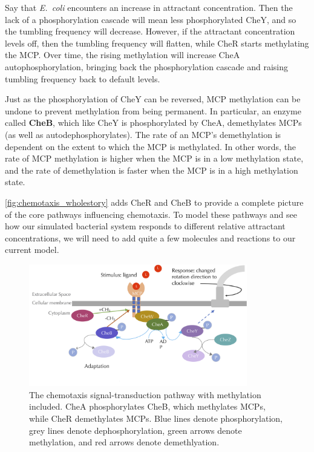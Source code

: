 Say that \textit{E.~coli} encounters an increase in attractant concentration. Then the lack of a phosphorylation cascade will mean less phosphorylated CheY, and so the tumbling frequency will decrease. However, if the attractant concentration levels off, then the tumbling frequency will flatten, while CheR starts methylating the MCP. Over time, the rising methylation will increase CheA autophosphorylation, bringing back the phosphorylation cascade and raising tumbling frequency back to default levels.

Just as the phosphorylation of CheY can be reversed, MCP methylation can be undone to prevent methylation from being permanent. In particular, an enzyme called \textbf{CheB}, which like CheY is phosphorylated by CheA, demethylates MCPs (as well as autodephosphorylates). The rate of an MCP's demethylation is dependent on the extent to which the MCP is methylated. In other words, the rate of MCP methylation is higher when the MCP is in a low methylation state, and the rate of demethylation is faster when the MCP is in a high methylation state.

\autoref{fig:chemotaxis_wholestory} adds CheR and CheB to provide a complete picture of the core pathways influencing chemotaxis. To model these pathways and see how our simulated bacterial system responds to different relative attractant concentrations, we will need to add quite a few molecules and reactions to our current model.\\

\begin{figure}[h]
\centering
\mySfFamily
\includegraphics[width = 0.85\textwidth]{../images/chemotaxis_wholestory.png}
\caption{The chemotaxis signal-transduction pathway with methylation included. CheA phosphorylates CheB, which methylates MCPs, while CheR demethylates MCPs. Blue lines denote phosphorylation, grey lines denote dephosphorylation, green arrows denote methylation, and red arrows denote demethlyation.}
\label{fig:chemotaxis_wholestory}
\end{figure}

